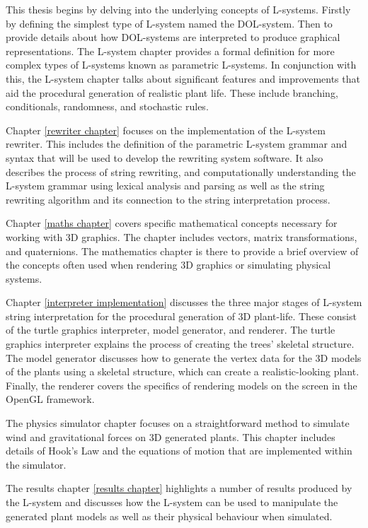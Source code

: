 This thesis begins by delving into the underlying concepts of L-systems. Firstly by defining the simplest type of L-system named the DOL-system. Then to provide details about how DOL-systems are interpreted to produce graphical representations. The L-system chapter provides a formal definition for more complex types of L-systems known as parametric L-systems. In conjunction with this, the L-system chapter talks about significant features and improvements that aid the procedural generation of realistic plant life. These include branching, conditionals, randomness, and stochastic rules.

Chapter \ref{rewriter chapter} focuses on the implementation of the L-system rewriter. This includes the definition of the parametric L-system grammar and syntax that will be used to develop the rewriting system software. It also describes the process of string rewriting, and computationally understanding the L-system grammar using lexical analysis and parsing as well as the string rewriting algorithm and its connection to the string interpretation process.

Chapter \ref{maths chapter} covers specific mathematical concepts necessary for working with 3D graphics. The chapter includes vectors, matrix transformations, and quaternions. The mathematics chapter is there to provide a brief overview of the concepts often used when rendering 3D graphics or simulating physical systems.  

Chapter \ref{interpreter implementation} discusses the three major stages of L-system string interpretation for the procedural generation of 3D plant-life. These consist of the turtle graphics interpreter, model generator, and renderer. The turtle graphics interpreter explains the process of creating the trees' skeletal structure. The model generator discusses how to generate the vertex data for the 3D models of the plants using a skeletal structure, which can create a realistic-looking plant. Finally, the renderer covers the specifics of rendering models on the screen in the OpenGL framework.

The physics simulator chapter focuses on a straightforward method to simulate wind and gravitational forces on 3D generated plants. This chapter includes details of Hook's Law and the equations of motion that are implemented within the simulator.

The results chapter \ref{results chapter} highlights a number of results produced by the L-system and discusses how the L-system can be used to manipulate the generated plant models as well as their physical behaviour when simulated. 